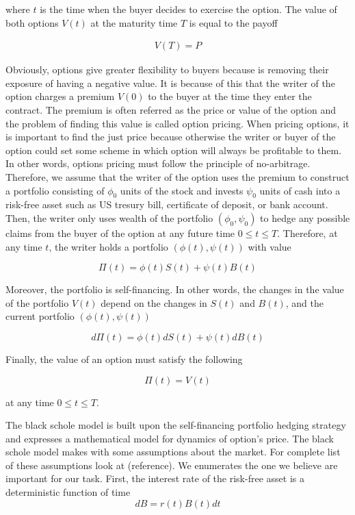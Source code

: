 where $t$ is the time when the buyer decides to exercise the option. 
The value of both options $V(t)$ at the maturity time $T$ is 
equal to the payoff

\begin{align}
  V(T) = P
\end{align}

Obviously, options give greater flexibility 
to buyers because is removing their exposure of having a negative value.
It is because of this that the writer of the option charges a premium $V(0)$ to the buyer
at the time they enter the contract. The premium is often referred as the price or value 
of the option and the problem of finding this value is called option pricing. 
When pricing options, it is important to find the just price because 
otherwise the writer or buyer of the option could set some scheme in which option
will always be profitable to them. In other words, options pricing must follow
the principle of no-arbitrage. Therefore, we assume that the writer of the option
uses the premium to construct a portfolio consisting of $\phi_0$ units of the 
stock and invests $\psi_0$ units of cash into a risk-free asset such as US
tresury bill, certificate of deposit, or bank account. Then, the writer only 
uses wealth of the portfolio $(\phi_0, \psi_0)$ to hedge any 
possible claims from the buyer of the option at any future time $0 \le t \le T$. 
Therefore, at any time $t$, the writer holds a portfolio $(\phi(t), \psi(t))$ 
with value

\begin{equation}
  \Pi(t) = \phi(t)S(t) + \psi(t)B(t)
\end{equation}

Moreover, the portfolio is self-financing. In other words, the changes in the value
of the portfolio $V(t)$ depend on the changes in $S(t)$ and $B(t)$, and the current
portfolio $(\phi(t), \psi(t))$

\begin{equation}
  d\Pi(t) = \phi(t)dS(t) + \psi(t)dB(t)
\end{equation}

Finally, the value of an option must satisfy the following

\begin{equation}
  \Pi(t) = V(t)
\end{equation}

at any time $0 \le t \le T$.

The black schole model is built upon the self-financing portfolio hedging strategy 
and expresses a mathematical model for dynamics of option's price. 
The black schole model makes with some assumptions about the market. For complete
list of these assumptions look at (reference). We enumerates the one we believe 
are important for our task. First, the interest rate of the risk-free asset is 
a deterministic function of time
\begin{equation}
  dB = r(t)B(t)dt
\end{equation}


